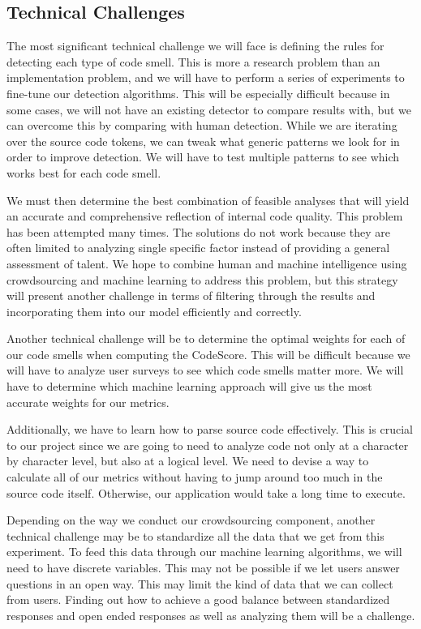 \documentclass{sig-alternate}
\begin{document}
\subsection{Technical Challenges}
\label{subsec:tech_challenges}

The most significant technical challenge we will face is defining the rules for detecting each type of code smell. This is more a research problem than an implementation problem, and we will have to perform a series of experiments to fine-tune our detection algorithms. This will be especially difficult because in some cases, we will not have an existing detector to compare results with, but we can overcome this by comparing with human detection. While we are iterating over the source code tokens, we can tweak what generic patterns we look for in order to improve detection. We will have to test multiple patterns to see which works best for each code smell.

We must then determine the best combination of feasible analyses that will yield an accurate and comprehensive reflection of internal code quality. This problem has been attempted many times. The solutions do not work because they are often limited to analyzing single specific factor instead of providing a general assessment of talent. We hope to combine human and machine intelligence using crowdsourcing and machine learning to address this problem, but this strategy will present another challenge in terms of filtering through the results and incorporating them into our model efficiently and correctly.

Another technical challenge will be to determine the optimal weights for each of our code smells when computing the CodeScore. This will be difficult because we will have to analyze user surveys to see which code smells matter more. We will have to determine which machine learning approach will give us the most accurate weights for our metrics. 

Additionally, we have to learn how to parse source code effectively. This is crucial to our project since we are going to need to analyze code not only at a character by character level, but also at a logical level. We need to devise a way to calculate all of our metrics without having to jump around too much in the source code itself. Otherwise, our application would take a long time to execute.

Depending on the way we conduct our crowdsourcing component, another technical challenge may be to standardize all the data that we get from this experiment. To feed this data through our machine learning algorithms, we will need to have discrete variables. This may not be possible if we let users answer questions in an open way. This may limit the kind of data that we can collect from users. Finding out how to achieve a good balance between standardized responses and open ended responses as well as analyzing them will be a challenge.
\end{document}

